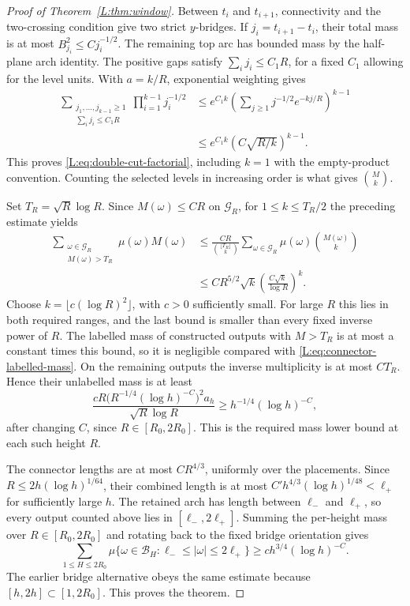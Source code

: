 \documentclass[11pt]{article}
\numberwithin{equation}{section}
\theoremstyle{definition}\newtheorem{definition}[theorem]{Definition}
\theoremstyle{remark}\newtheorem{remark}[theorem]{Remark}
\begin{document}
\begin{proof}[Proof of Theorem~\ref{L:thm:window}]
Between $t_i$ and $t_{i+1}$, connectivity and the two-crossing condition
give two strict $y$-bridges. If $j_i=t_{i+1}-t_i$, their total mass is
at most $B_{j_i}^2\le Cj_i^{-1/2}$. The remaining top arc has bounded
mass by the half-plane arch identity. The positive gaps satisfy
$\sum_i j_i\le C_1R$, for a fixed $C_1$ allowing for the level units.
With $a=k/R$, exponential weighting gives
\[
 \begin{aligned}
 \sum_{\substack{j_1,\ldots,j_{k-1}\ge1\\
                  \sum_i j_i\le C_1R}}
       \prod_{i=1}^{k-1}j_i^{-1/2}
 &\le e^{C_1k}
       \left(\sum_{j\ge1}j^{-1/2}e^{-kj/R}\right)^{k-1}\\
 &\le e^{C_1k}\left(C\sqrt{R/k}\right)^{k-1}.
 \end{aligned}
\]
This proves \eqref{L:eq:double-cut-factorial}, including $k=1$ with
the empty-product convention. Counting the selected levels in
increasing order is what gives $\binom Mk$.

Set $T_R=\sqrt R\log R$. Since $M(\omega)\le CR$ on
$\mathcal G_R$, for $1\le k\le T_R/2$ the preceding estimate yields
\[
 \begin{aligned}
 \sum_{\substack{\omega\in\mathcal G_R\\M(\omega)>T_R}}
       \mu(\omega)M(\omega)
 &\le \frac{CR}{\binom{\lfloor T_R\rfloor}{k}}
       \sum_{\omega\in\mathcal G_R}\mu(\omega)
       \binom{M(\omega)}{k}\\
 &\le CR^{5/2}\sqrt k
       \left(\frac{C\sqrt k}{\log R}\right)^k.
 \end{aligned}
\]
Choose $k=\lfloor c(\log R)^2\rfloor$, with $c>0$ sufficiently
small. For large $R$ this lies in both required ranges, and the last
bound is smaller than every fixed inverse power of $R$. The labelled
mass of constructed outputs with $M>T_R$ is at most a constant times
this bound, so it is negligible compared with
\eqref{L:eq:connector-labelled-mass}. On the remaining outputs the
inverse multiplicity is at most $CT_R$. Hence their unlabelled mass
is at least
\[
 \frac{cR\bigl(R^{-1/4}(\log h)^{-C}\bigr)^2a_h}
      {\sqrt R\log R}
 \ge h^{-1/4}(\log h)^{-C},
\]
after changing $C$, since $R\in[R_0,2R_0]$. This is the required
mass lower bound at each such height $R$.

The connector lengths are at most $CR^{4/3}$, uniformly over the
placements.  Since $R\le2h(\log h)^{1/64}$, their combined length is
at most $C'h^{4/3}(\log h)^{1/48}<\ell_+$ for sufficiently large $h$.
The retained arch has length between $\ell_-$ and $\ell_+$, so every
output counted above lies in $[\ell_-,2\ell_+]$.  Summing the per-height
mass over $R\in[R_0,2R_0]$ and rotating back to the fixed bridge
orientation gives
\begin{equation}
 \sum_{1\le H\le2R_0}
 \mu\{\omega\in\mathcal B_H:\ell_-\le|\omega|\le2\ell_+\}
 \ge c h^{3/4}(\log h)^{-C}.
 \label{L:eq11}
\end{equation}
The earlier bridge alternative obeys the same estimate because
$[h,2h]\subset[1,2R_0]$.  This proves the theorem.
\end{proof}
\end{document}
